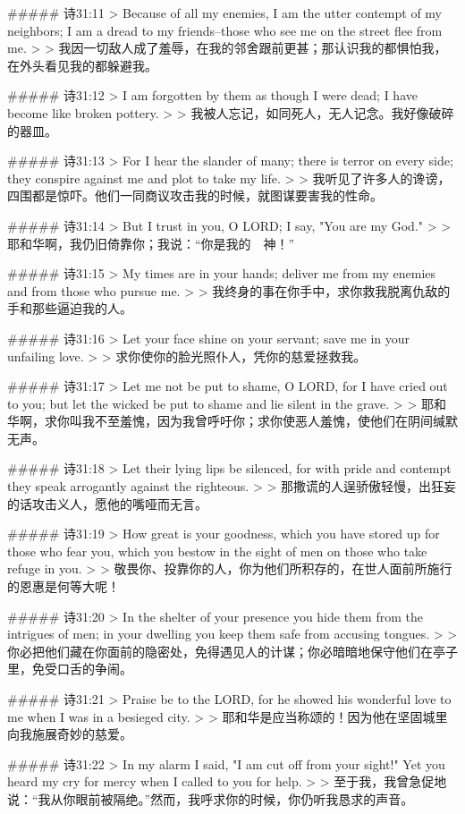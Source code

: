 ##### 诗31:11
> Because of all my enemies, I am the utter contempt of my neighbors; I am a dread to my friends--those who see me on the street flee from me.
>
> 我因一切敌人成了羞辱，在我的邻舍跟前更甚；那认识我的都惧怕我，在外头看见我的都躲避我。


##### 诗31:12
> I am forgotten by them as though I were dead; I have become like broken pottery.
>
> 我被人忘记，如同死人，无人记念。我好像破碎的器皿。


##### 诗31:13
> For I hear the slander of many; there is terror on every side; they conspire against me and plot to take my life.
>
> 我听见了许多人的谗谤，四围都是惊吓。他们一同商议攻击我的时候，就图谋要害我的性命。


##### 诗31:14
> But I trust in you, O LORD; I say, "You are my God."
>
> 耶和华啊，我仍旧倚靠你；我说：“你是我的　神！”


##### 诗31:15
> My times are in your hands; deliver me from my enemies and from those who pursue me.
>
> 我终身的事在你手中，求你救我脱离仇敌的手和那些逼迫我的人。


##### 诗31:16
> Let your face shine on your servant; save me in your unfailing love.
>
> 求你使你的脸光照仆人，凭你的慈爱拯救我。


##### 诗31:17
> Let me not be put to shame, O LORD, for I have cried out to you; but let the wicked be put to shame and lie silent in the grave.
>
> 耶和华啊，求你叫我不至羞愧，因为我曾呼吁你；求你使恶人羞愧，使他们在阴间缄默无声。


##### 诗31:18
> Let their lying lips be silenced, for with pride and contempt they speak arrogantly against the righteous.
>
> 那撒谎的人逞骄傲轻慢，出狂妄的话攻击义人，愿他的嘴哑而无言。


##### 诗31:19
> How great is your goodness, which you have stored up for those who fear you, which you bestow in the sight of men on those who take refuge in you.
>
> 敬畏你、投靠你的人，你为他们所积存的，在世人面前所施行的恩惠是何等大呢！


##### 诗31:20
> In the shelter of your presence you hide them from the intrigues of men; in your dwelling you keep them safe from accusing tongues.
>
> 你必把他们藏在你面前的隐密处，免得遇见人的计谋；你必暗暗地保守他们在亭子里，免受口舌的争闹。


##### 诗31:21
> Praise be to the LORD, for he showed his wonderful love to me when I was in a besieged city.
>
> 耶和华是应当称颂的！因为他在坚固城里向我施展奇妙的慈爱。


##### 诗31:22
> In my alarm I said, "I am cut off from your sight!" Yet you heard my cry for mercy when I called to you for help.
>
> 至于我，我曾急促地说：“我从你眼前被隔绝。”然而，我呼求你的时候，你仍听我恳求的声音。


